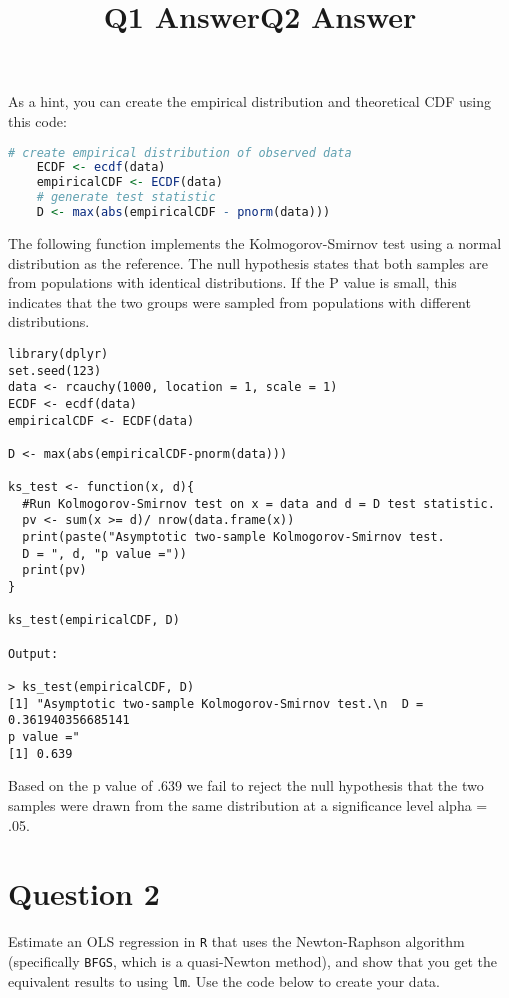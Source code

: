 \documentclass[12pt,letterpaper]{article}
\begin{document}
	
\noindent As a hint, you can create the empirical distribution and theoretical CDF using this code:

\begin{lstlisting}[language=R]
	# create empirical distribution of observed data
	ECDF <- ecdf(data)
	empiricalCDF <- ECDF(data)
	# generate test statistic
	D <- max(abs(empiricalCDF - pnorm(data))) \end{lstlisting}

\vspace{.5in}

\title{Q1 Answer}
\item The following function implements the Kolmogorov-Smirnov test
using a normal distribution as the reference. The null hypothesis states that both samples are from populations with identical distributions. If the P value is small, this indicates that the two groups were sampled from populations with different distributions.

\begin{verbatim}
library(dplyr)
set.seed(123)
data <- rcauchy(1000, location = 1, scale = 1)
ECDF <- ecdf(data)
empiricalCDF <- ECDF(data)

D <- max(abs(empiricalCDF-pnorm(data)))

ks_test <- function(x, d){
  #Run Kolmogorov-Smirnov test on x = data and d = D test statistic.
  pv <- sum(x >= d)/ nrow(data.frame(x))
  print(paste("Asymptotic two-sample Kolmogorov-Smirnov test.
  D = ", d, "p value ="))
  print(pv)
}

ks_test(empiricalCDF, D)

Output:

> ks_test(empiricalCDF, D)
[1] "Asymptotic two-sample Kolmogorov-Smirnov test.\n  D =  0.361940356685141 
p value ="
[1] 0.639

\end{verbatim}
Based on the p value of .639 we fail to reject the null hypothesis that the two samples were drawn from the same distribution at a significance level alpha = .05.

\vspace{.5in}
\section*{Question 2}
\noindent Estimate an OLS regression in \texttt{R} that uses the Newton-Raphson algorithm (specifically \texttt{BFGS}, which is a quasi-Newton method), and show that you get the equivalent results to using \texttt{lm}. Use the code below to create your data.
\vspace{.5cm}
 
\vspace{1in}
\title{Q2 Answer}
\end{document}
